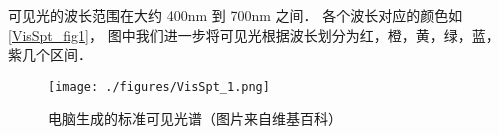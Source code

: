 
可见光的波长范围在大约 400nm 到 700nm 之间． 各个波长对应的颜色如\autoref{VisSpt_fig1}， 图中我们进一步将可见光根据波长划分为红，橙，黄，绿，蓝，紫几个区间．

\begin{figure}[ht]
\centering
\texttt{[image: ./figures/VisSpt\_1.png]}
\caption{电脑生成的标准可见光谱（图片来自维基百科）} \label{VisSpt_fig1}
\end{figure}
